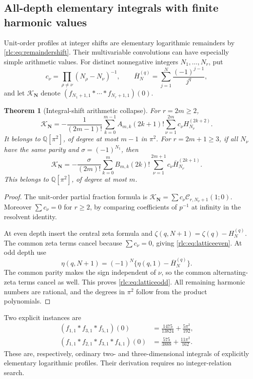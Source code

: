 \documentclass[11pt,a4paper]{article}
\numberwithin{equation}{section}
\newtheorem{theorem}{Theorem}[section]
\theoremstyle{definition}\newtheorem{definition}[theorem]{Definition}
\theoremstyle{remark}\newtheorem{remark}[theorem]{Remark}
\newcommand{\CC}{\mathcal C}
\begin{document}
\subsection{All-depth elementary integrals with finite harmonic values}
Unit-order profiles at integer shifts are elementary logarithmic
remainders by \eqref{rlc:eq:remaindershift}. Their multivariable
convolutions can have especially simple arithmetic values.
For distinct nonnegative integers $N_1,\ldots,N_r$, put
\[
 c_\nu=\prod_{\rho\ne\nu}(N_\rho-N_\nu)^{-1},\qquad
 \overline H_N^{(q)}=\sum_{j=1}^N\frac{(-1)^{j-1}}{j^q},
\]
and let $\mathcal K_{\boldsymbol N}$ denote
$(f_{N_1+1,1}*\cdots*f_{N_r+1,1})(0)$.

\begin{theorem}[Integral-shift arithmetic collapse]
\label{rlc:thm:lattice}
For $r=2m\ge2$,
\begin{equation}\label{rlc:eq:latticeeven}
 \mathcal K_{\boldsymbol N}
 =-\frac1{(2m-1)!}\sum_{k=0}^{m-1}A_{m,k}(2k+1)!
          \sum_{\nu=1}^{2m}c_\nu H_{N_\nu}^{(2k+2)}.
\end{equation}
It belongs to $\mathbb Q[\pi^2]$, of degree at most $m-1$ in $\pi^2$.
For $r=2m+1\ge3$, if all $N_\nu$ have the same parity and
$\sigma=(-1)^{N_1}$, then
\begin{equation}\label{rlc:eq:latticeodd}
 \mathcal K_{\boldsymbol N}
 =-\frac{\sigma}{(2m)!}\sum_{k=0}^{m}B_{m,k}(2k)!
          \sum_{\nu=1}^{2m+1}c_\nu\overline H_{N_\nu}^{(2k+1)}.
\end{equation}
This belongs to $\mathbb Q[\pi^2]$, of degree at most $m$.
\end{theorem}
\begin{proof}
The unit-order partial fraction formula is
$\mathcal K_{\boldsymbol N}=\sum c_\nu\CC_{r,N_\nu+1}(1;0)$.
Moreover $\sum c_\nu=0$ for $r\ge2$, by comparing coefficients of
$p^{-1}$ at infinity in the resolvent identity.

At even depth insert the central zeta formula and
$\zeta(q,N+1)=\zeta(q)-H_N^{(q)}$. The common zeta terms cancel because
$\sum c_\nu=0$, giving \eqref{rlc:eq:latticeeven}.
At odd depth use
\[
 \eta(q,N+1)=(-1)^N\{\eta(q,1)-\overline H_N^{(q)}\}.
\]
The common parity makes the sign independent of $\nu$, so the common
alternating-zeta terms cancel as well. This proves
\eqref{rlc:eq:latticeodd}. All remaining harmonic numbers are rational,
and the degrees in $\pi^2$ follow from the product polynomials.
\end{proof}

Two explicit instances are
\begin{align}
 (f_{1,1}*f_{3,1}*f_{5,1})(0)
       &=\frac{1475}{13824}+\frac{5\pi^2}{192},
       \label{rlc:eq:lattice3}\\
 (f_{1,1}*f_{2,1}*f_{3,1}*f_{4,1})(0)
       &=\frac{575}{3888}+\frac{11\pi^2}{162}.
       \label{rlc:eq:lattice4}
\end{align}
These are, respectively, ordinary two- and three-dimensional integrals
of explicitly elementary logarithmic profiles. Their derivation requires
no integer-relation search.
\end{document}
